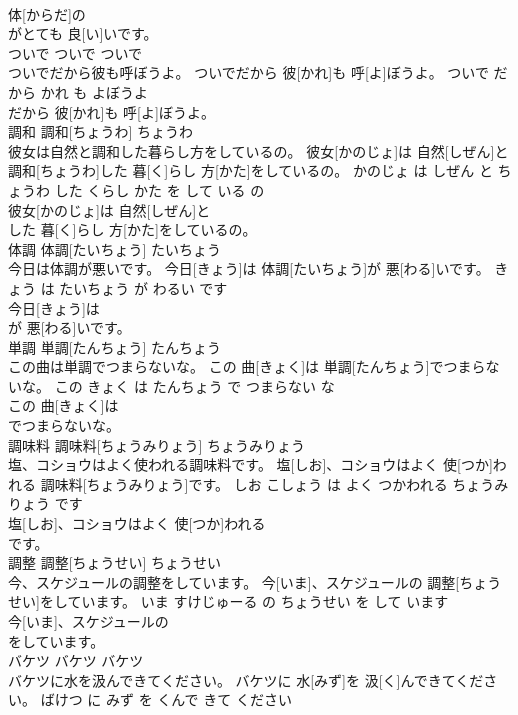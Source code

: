 \documentclass[8pt]{extreport}
\begin{document}
\begin{CJK}{UTF8}{min}
\\	体[からだ]の
\\	がとても 良[い]いです。			
\\	ついで	ついで	ついで	
\\	ついでだから彼も呼ぼうよ。	ついでだから 彼[かれ]も 呼[よ]ぼうよ。	ついで だから かれ も よぼうよ	
\\	だから 彼[かれ]も 呼[よ]ぼうよ。			
\\	調和	調和[ちょうわ]	ちょうわ	
\\	彼女は自然と調和した暮らし方をしているの。	彼女[かのじょ]は 自然[しぜん]と 調和[ちょうわ]した 暮[く]らし 方[かた]をしているの。	かのじょ は しぜん と ちょうわ した くらし かた を して いる の	
\\	彼女[かのじょ]は 自然[しぜん]と
\\	した 暮[く]らし 方[かた]をしているの。			
\\	体調	体調[たいちょう]	たいちょう	
\\	今日は体調が悪いです。	今日[きょう]は 体調[たいちょう]が 悪[わる]いです。	きょう は たいちょう が わるい です	
\\	今日[きょう]は
\\	が 悪[わる]いです。			
\\	単調	単調[たんちょう]	たんちょう	
\\	この曲は単調でつまらないな。	この 曲[きょく]は 単調[たんちょう]でつまらないな。	この きょく は たんちょう で つまらない な	
\\	この 曲[きょく]は
\\	でつまらないな。			
\\	調味料	調味料[ちょうみりょう]	ちょうみりょう	
\\	塩、コショウはよく使われる調味料です。	塩[しお]、コショウはよく 使[つか]われる 調味料[ちょうみりょう]です。	しお こしょう は よく つかわれる ちょうみりょう です	
\\	塩[しお]、コショウはよく 使[つか]われる
\\	です。			
\\	調整	調整[ちょうせい]	ちょうせい	
\\	今、スケジュールの調整をしています。	今[いま]、スケジュールの 調整[ちょうせい]をしています。	いま すけじゅーる の ちょうせい を して います	
\\	今[いま]、スケジュールの
\\	をしています。			
\\	バケツ	バケツ	バケツ	
\\	バケツに水を汲んできてください。	バケツに 水[みず]を 汲[く]んできてください。	ばけつ に みず を くんで きて ください	

\end{CJK}
\end{document}
